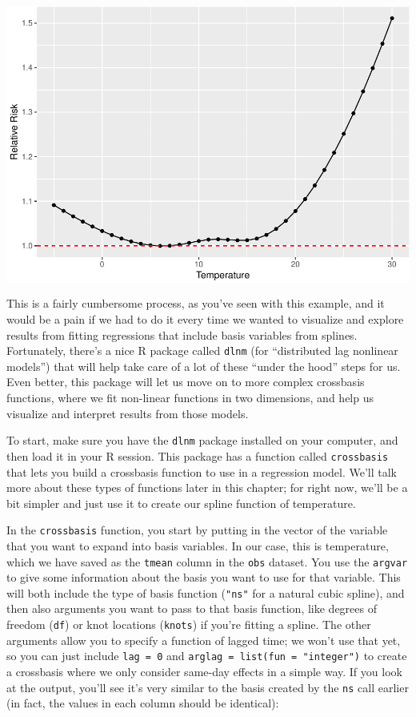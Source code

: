 \documentclass[
]{book}
\begin{document}
\includegraphics{adv_epi_analysis_files/figure-latex/unnamed-chunk-75-1.pdf}

This is a fairly cumbersome process, as you've seen with this example, and it would be a
pain if we had to do it every time we wanted to visualize and explore results from fitting
regressions that include basis variables from splines. Fortunately, there's a nice R package
called \texttt{dlnm} (for ``distributed lag nonlinear models'') that will help take care of a lot of
these ``under the hood'' steps for us. Even better, this package will let us move on to more
complex crossbasis functions, where we fit non-linear functions in two dimensions, and help
us visualize and interpret results from those models.

To start, make sure you have the \texttt{dlnm} package installed on your computer, and then load
it in your R session. This package has a function called \texttt{crossbasis} that lets you build
a crossbasis function to use in a regression model. We'll talk more about these types
of functions later in this chapter; for right now, we'll be a bit simpler and just use it
to create our spline function of temperature.

In the \texttt{crossbasis} function, you start by putting in the vector of the variable that you
want to expand into basis variables. In our case, this is temperature, which we have saved
as the \texttt{tmean} column in the \texttt{obs} dataset. You use the \texttt{argvar} to give some information
about the basis you want to use for that variable. This will both include the type of
basis function (\texttt{"ns"} for a natural cubic spline), and then also arguments you want to
pass to that basis function, like degrees of freedom (\texttt{df}) or knot locations (\texttt{knots})
if you're fitting a spline. The other arguments allow you to specify a function of lagged
time; we won't use that yet, so you can just include \texttt{lag\ =\ 0} and \texttt{arglag\ =\ list(fun\ =\ "integer")} to create a crossbasis where we only consider same-day effects in a simple way.
If you look at the output, you'll see it's very similar to the basis created by the
\texttt{ns} call earlier (in fact, the values in each column should be identical):
\end{document}
